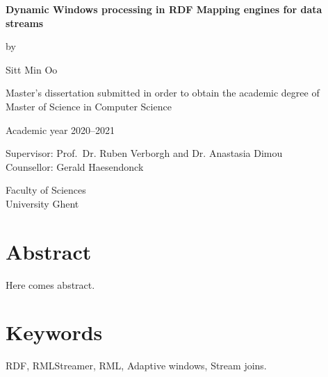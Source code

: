 \newpage

{
\setlength{\baselineskip}{14pt}
\setlength{\parindent}{0pt}
\setlength{\parskip}{8pt}

\begin{center}

\noindent \textbf{\huge
Dynamic Windows processing in RDF Mapping engines for data streams
}

by

Sitt Min Oo

Master's dissertation submitted in order to obtain the academic degree of\\
Master of Science in Computer Science

Academic year 2020--2021

Supervisor: Prof.~Dr. Ruben Verborgh and Dr. Anastasia Dimou \\
Counsellor: Gerald Haesendonck

Faculty of Sciences\\
University Ghent

\end{center}

\section*{Abstract}


Here comes abstract.


\section*{Keywords}

RDF, RMLStreamer, RML, Adaptive windows, Stream joins.
}

\let\cleardoublepage\clearpage
